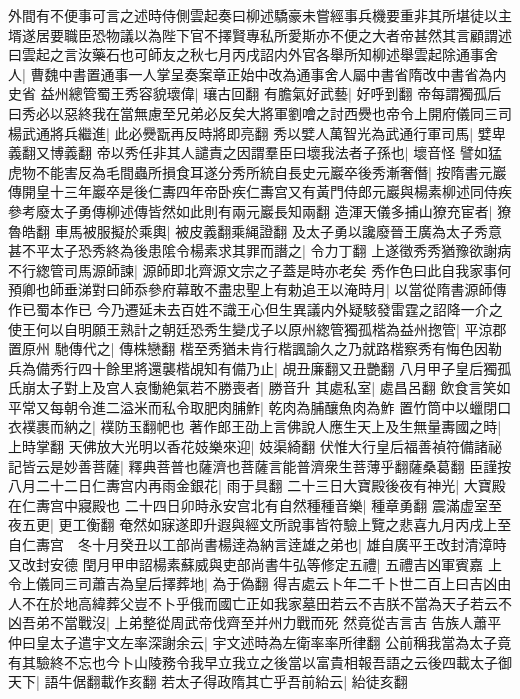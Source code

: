 外間有不便事可言之述時侍側雲起奏曰柳述驕豪未嘗經事兵機要重非其所堪徒以主壻遂居要職臣恐物議以為陛下官不擇賢專私所愛斯亦不便之大者帝甚然其言顧謂述曰雲起之言汝藥石也可師友之秋七月丙戌詔内外官各舉所知柳述舉雲起除通事舍人|{
	曹魏中書置通事一人掌呈奏案章正始中改為通事舍人屬中書省隋改中書省為内史省}
益州總管蜀王秀容貌瓌偉|{
	瓖古回翻}
有膽氣好武藝|{
	好呼到翻}
帝每謂獨孤后曰秀必以惡終我在當無慮至兄弟必反矣大將軍劉噲之討西㸑也帝令上開府儀同三司楊武通將兵繼進|{
	此必㸑翫再反時將即亮翻}
秀以嬖人萬智光為武通行軍司馬|{
	嬖卑義翻又博義翻}
帝以秀任非其人譴責之因謂羣臣曰壞我法者子孫也|{
	壞音怪}
譬如猛虎物不能害反為毛間蟲所損食耳遂分秀所統自長史元巖卒後秀漸奢僭|{
	按隋書元巖傳開皇十三年巖卒是後仁夀四年帝卧疾仁夀宫又有黃門侍郎元巖與楊素柳述同侍疾參考廢太子勇傳柳述傳皆然如此則有兩元巖長知兩翻}
造渾天儀多捕山獠充宦者|{
	獠魯皓翻}
車馬被服擬於乘輿|{
	被皮義翻乘䋲證翻}
及太子勇以讒廢晉王廣為太子秀意甚不平太子恐秀終為後患隂令楊素求其罪而譖之|{
	令力丁翻}
上遂徵秀秀猶豫欲謝病不行緫管司馬源師諫|{
	源師即北齊源文宗之子蓋是時亦老矣}
秀作色曰此自我家事何預卿也師垂涕對曰師忝參府幕敢不盡忠聖上有勅追王以淹時月|{
	以當從隋書源師傳作已蜀本作已}
今乃遷延未去百姓不識王心但生異議内外疑駭發雷霆之詔降一介之使王何以自明願王熟計之朝廷恐秀生變戊子以原州緫管獨孤楷為益州揔管|{
	平涼郡置原州}
馳傳代之|{
	傳株戀翻}
楷至秀猶未肯行楷諷諭久之乃就路楷察秀有悔色因勒兵為備秀行四十餘里將還襲楷覘知有備乃止|{
	覘丑廉翻又丑艷翻}
八月甲子皇后獨孤氏崩太子對上及宫人哀慟絶氣若不勝喪者|{
	勝音升}
其處私室|{
	處昌呂翻}
飲食言笑如平常又每朝令進二溢米而私令取肥肉脯鮓|{
	乾肉為脯釀魚肉為鮓}
置竹筒中以蠟閉口衣襆裹而納之|{
	襆防玉翻帊也}
著作郎王劭上言佛說人應生天上及生無量夀國之時|{
	上時掌翻}
天佛放大光明以香花妓樂來迎|{
	妓渠綺翻}
伏惟大行皇后福善禎符備諸祕記皆云是妙善菩薩|{
	釋典菩普也薩濟也菩薩言能普濟衆生菩薄乎翻薩桑葛翻}
臣謹按八月二十二日仁夀宫内再雨金銀花|{
	雨于具翻}
二十三日大寶殿後夜有神光|{
	大寶殿在仁夀宫中寢殿也}
二十四日卯時永安宫北有自然種種音樂|{
	種章勇翻}
震滿虚室至夜五更|{
	更工衡翻}
奄然如寐遂即升遐與經文所說事皆符驗上覽之悲喜九月丙戌上至自仁夀宫　冬十月癸丑以工部尚書楊逹為納言逹雄之弟也|{
	雄自廣平王改封清漳時又改封安德}
閏月甲申詔楊素蘇威與吏部尚書牛弘等修定五禮|{
	五禮吉凶軍賓嘉}
上令上儀同三司蕭吉為皇后擇葬地|{
	為于偽翻}
得吉處云卜年二千卜世二百上曰吉凶由人不在於地高緯葬父豈不卜乎俄而國亡正如我家墓田若云不吉朕不當為天子若云不凶吾弟不當戰沒|{
	上弟整從周武帝伐齊至并州力戰而死}
然竟從吉言吉告族人蕭平仲曰皇太子遣宇文左率深謝余云|{
	宇文述時為左衛率率所律翻}
公前稱我當為太子竟有其驗終不忘也今卜山陵務令我早立我立之後當以富貴相報吾語之云後四載太子御天下|{
	語牛倨翻載作亥翻}
若太子得政隋其亡乎吾前紿云|{
	紿徒亥翻}

